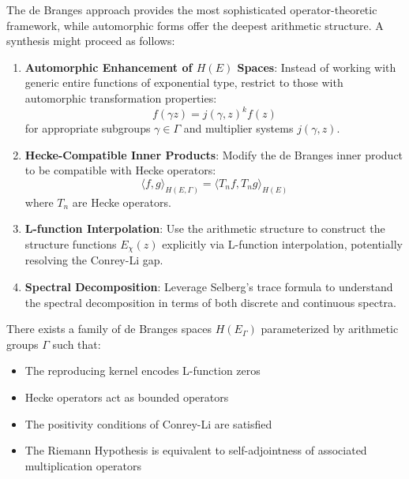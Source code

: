 The de Branges approach provides the most sophisticated operator-theoretic framework, while automorphic forms offer the deepest arithmetic structure. A synthesis might proceed as follows:

\begin{approach}
\begin{enumerate}
\item \textbf{Automorphic Enhancement of $H(E)$ Spaces}: Instead of working with generic entire functions of exponential type, restrict to those with automorphic transformation properties:
\begin{equation}
f(\gamma z) = j(\gamma, z)^k f(z)
\end{equation}
for appropriate subgroups $\gamma \in \Gamma$ and multiplier systems $j(\gamma, z)$.

\item \textbf{Hecke-Compatible Inner Products}: Modify the de Branges inner product to be compatible with Hecke operators:
\begin{equation}
\langle f, g \rangle_{H(E,\Gamma)} = \langle T_n f, T_n g \rangle_{H(E)}
\end{equation}
where $T_n$ are Hecke operators.

\item \textbf{L-function Interpolation}: Use the arithmetic structure to construct the structure functions $E_\chi(z)$ explicitly via L-function interpolation, potentially resolving the Conrey-Li gap.

\item \textbf{Spectral Decomposition}: Leverage Selberg's trace formula to understand the spectral decomposition in terms of both discrete and continuous spectra.
\end{enumerate}
\end{approach}

\begin{conjecture}
There exists a family of de Branges spaces $H(E_\Gamma)$ parameterized by arithmetic groups $\Gamma$ such that:
\begin{itemize}
\item The reproducing kernel encodes L-function zeros
\item Hecke operators act as bounded operators
\item The positivity conditions of Conrey-Li are satisfied
\item The Riemann Hypothesis is equivalent to self-adjointness of associated multiplication operators
\end{itemize}
\end{conjecture}


